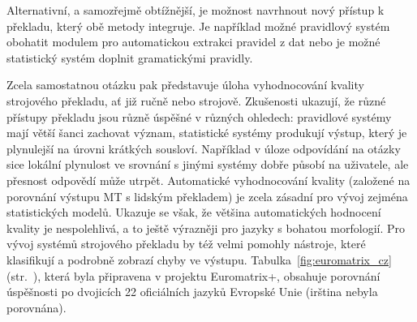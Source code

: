 \begin{multicols}{2}
Alternativní, a samozřejmě obtížnější, je možnost navrhnout nový přístup k překladu, který obě metody integruje. Je například možné pravidlový systém obohatit modulem pro automatickou extrakci pravidel z dat nebo je možné statistický systém doplnit gramatickými pravidly.

Zcela samostatnou otázku pak představuje úloha vyhodnocování kvality strojového překladu, ať již ručně nebo strojově. Zkušenosti ukazují, že různé přístupy překladu jsou různě úspěšné v různých ohledech: pravidlové systémy mají větší šanci zachovat význam, statistické systémy produkují výstup, který je plynulejší na úrovni krátkých sousloví. Například v úloze odpovídání na otázky sice lokální plynulost ve srovnání s jinými systémy dobře působí na uživatele, ale přesnost odpovědí může utrpět. Automatické vyhodnocování kvality (založené na porovnání výstupu MT s lidským překladem) je zcela zásadní pro vývoj zejména statistických modelů. Ukazuje se však, že většina automatických hodnocení kvality je nespolehlivá, a to ještě výrazněji pro jazyky s bohatou morfologií. Pro vývoj systémů strojového překladu by též velmi pomohly nástroje, které klasifikují a podrobně zobrazí chyby ve výstupu.
Tabulka~\ref{fig:euromatrix_cz} (str.~\pageref{fig:euromatrix_cz}), která byla připravena v projektu Euromatrix+, obsahuje porovnání úspěšnosti po dvojicích 22 oficiálních jazyků Evropské Unie (irština nebyla porovnána).


\end{multicols}
